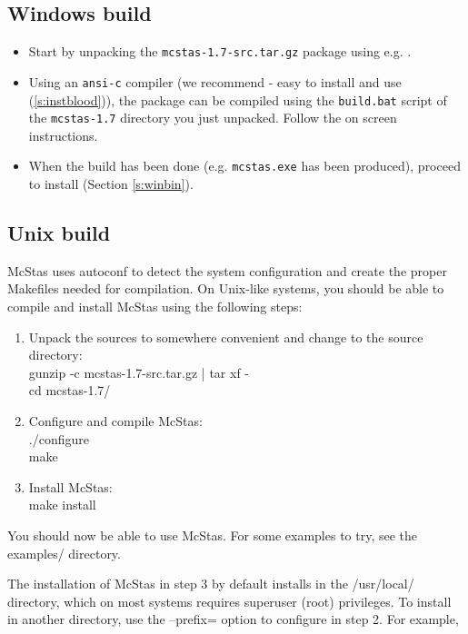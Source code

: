 \subsection{Windows build}
\begin{itemize}
\item{Start by unpacking the \texttt{mcstas-1.7-src.tar.gz} package using
e.g. .}
\item{Using an \texttt{ansi-c} compiler (we recommend
 - easy to install
and use (\ref{s:instblood})), the
 package can be
compiled using the \texttt{build.bat} script of the
\texttt{mcstas-1.7} directory you just unpacked. Follow the on screen
instructions.} 
\item{When the build has been done (e.g. \texttt{mcstas.exe}
has been produced), proceed to install (Section \ref{s:winbin}).}
\end{itemize}
\subsection{Unix build}
McStas uses autoconf to detect the system configuration and create the
proper Makefiles needed for compilation. On Unix-like systems, you
should be able to compile and install McStas using the following steps:
\begin{enumerate}
\item{Unpack the sources to somewhere convenient and change to the
    source directory:\\
  gunzip -c mcstas-1.7-src.tar.gz | tar xf -\\
  cd mcstas-1.7/}
\item{Configure and compile McStas:\\
  ./configure\\
  make}
\item{Install McStas:\\
  make install}
\end{enumerate}

\noindent You should now be able to use McStas. For some examples to try, see the
examples/ directory.

\noindent The installation of McStas in step 3 by default installs in the
/usr/local/ directory, which on most systems requires superuser (root)
privileges. To install in another directory, use the --prefix= option to
configure in step 2. For example,\\

